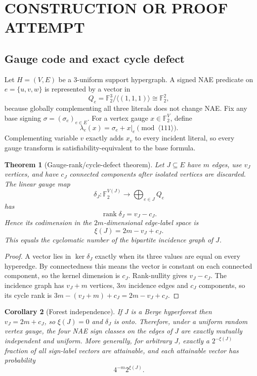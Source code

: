 \documentclass[11pt]{article}
\newtheorem{theorem}{Theorem}
\newtheorem{corollary}[theorem]{Corollary}
\begin{document}
\section{CONSTRUCTION OR PROOF ATTEMPT}
\subsection{Gauge code and exact cycle defect}
Let $H=(V,E)$ be a 3-uniform support hypergraph. A signed NAE predicate on $e=\{u,v,w\}$ is represented by a vector in
\[Q_e=\mathbb F_2^3/\langle(1,1,1)\rangle\cong\mathbb F_2^2,\]
because globally complementing all three literals does not change NAE. Fix any base signing $\sigma=(\sigma_e)_{e\in E}$. For a vertex gauge $x\in\mathbb F_2^V$, define
\[\lambda_e(x)=\sigma_e+x|_e\pmod{\langle111\rangle}.\]
Complementing variable $v$ exactly adds $x_v$ to every incident literal, so every gauge transform is satisfiability-equivalent to the base formula.

\begin{theorem}[Gauge-rank/cycle-defect theorem]
Let $J\subseteq E$ have $m$ edges, use $v_J$ vertices, and have $c_J$ connected components after isolated vertices are discarded. The linear gauge map
\[\delta_J:\mathbb F_2^{V(J)}\to\bigoplus_{e\in J}Q_e\]
has
\[\boxed{\operatorname{rank}\delta_J=v_J-c_J.}\]
Hence its codimension in the $2m$-dimensional edge-label space is
\[\boxed{\xi(J)=2m-v_J+c_J.}\]
This equals the cyclomatic number of the bipartite incidence graph of $J$.
\end{theorem}
\begin{proof}
A vector lies in $\ker\delta_J$ exactly when its three values are equal on every hyperedge. By connectedness this means the vector is constant on each connected component, so the kernel dimension is $c_J$. Rank-nullity gives $v_J-c_J$. The incidence graph has $v_J+m$ vertices, $3m$ incidence edges and $c_J$ components, so its cycle rank is $3m-(v_J+m)+c_J=2m-v_J+c_J$.
\end{proof}

\begin{corollary}[Forest independence]
If $J$ is a Berge hyperforest then $v_J=2m+c_J$, so $\xi(J)=0$ and $\delta_J$ is onto. Therefore, under a uniform random vertex gauge, the four NAE sign classes on the edges of $J$ are exactly mutually independent and uniform.
More generally, for arbitrary $J$, exactly a $2^{-\xi(J)}$ fraction of all sign-label vectors are attainable, and each attainable vector has probability
\[4^{-m}2^{\xi(J)}.\]
\end{corollary}
\end{document}
